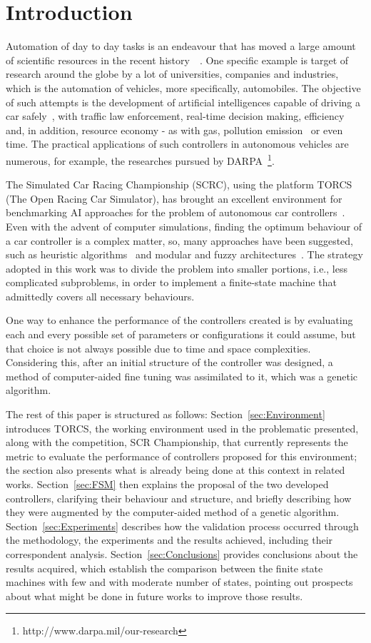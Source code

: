 \section{\textbf{Introduction}} \label{sec:Intro}
	
	Automation of day to day tasks is an endeavour that has moved a large amount of scientific resources in the recent history~\cite{INDUS}~\cite{APPLI}. One specific example is target of research around the globe by a lot of universities, companies	and industries, which is the automation of vehicles, more specifically, automobiles. The objective of such attempts is the development of artificial intelligences capable of driving a car safely~\cite{SAFE}, with traffic law enforcement, real-time decision making, efficiency and, in addition, resource economy - as with gas, pollution emission~\cite{AUTOM} or even time. The practical applications of such controllers in autonomous vehicles are numerous, for example, the researches pursued by DARPA~\footnote{http://www.darpa.mil/our-research}.

	The Simulated Car Racing Championship (SCRC), using the platform TORCS (The Open Racing Car Simulator), has	brought an excellent environment for benchmarking AI approaches for the problem of autonomous car controllers~\cite{2009}. Even with the advent of computer simulations, finding the optimum behaviour of a car controller is a complex matter, so, many approaches have been suggested, such as heuristic algorithms~\cite{MrRacer} and modular and fuzzy architectures~\cite{AUTOPIA}. The strategy adopted in this work was to divide the problem into smaller portions, i.e., less complicated subproblems, in order to implement a finite-state machine that admittedly covers all necessary behaviours.
	
	One way to enhance the performance of the controllers created is by evaluating each and every possible set of parameters or configurations it could assume, but that choice is not always possible due to time and space complexities. Considering this, after an initial structure of the controller was designed, a method of computer-aided fine tuning was assimilated to it, which was a genetic algorithm.
	
	The rest of this paper is structured as follows: Section~\ref{sec:Environment} introduces TORCS, the working environment used in the problematic presented, along with the competition, SCR Championship, that currently represents the metric to evaluate the performance of controllers proposed for this environment; the section also presents what is already being done at this context in related works. Section~\ref{sec:FSM} then explains the proposal of the two developed controllers, clarifying their behaviour and structure, and briefly describing how they were augmented by the computer-aided method of a genetic algorithm. Section~\ref{sec:Experiments} describes how the validation process occurred through the methodology, the experiments and the results achieved, including their correspondent analysis. Section~\ref{sec:Conclusions} provides conclusions about the results acquired, which establish the comparison between the finite state machines with few and with moderate number of states, pointing out prospects about what might be done in future works to improve those results.
